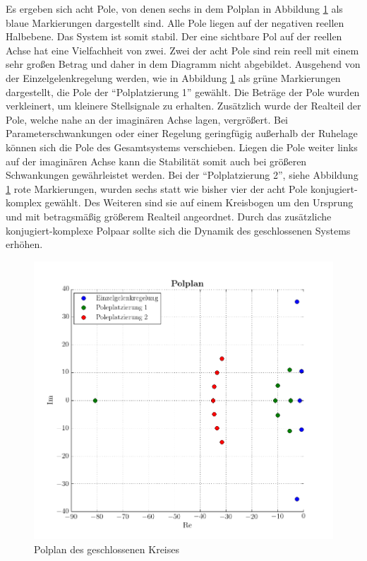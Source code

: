 Es ergeben sich acht Pole, von denen sechs in dem Polplan in Abbildung \ref{fig:Polplan} als blaue Markierungen dargestellt sind. Alle Pole liegen auf der negativen reellen Halbebene. Das System ist somit stabil.  Der eine sichtbare Pol auf der reellen Achse hat eine Vielfachheit von zwei. Zwei der acht Pole sind rein reell mit einem sehr großen Betrag und daher in dem Diagramm nicht abgebildet. \newline
Ausgehend von der Einzelgelenkregelung werden, wie in Abbildung \ref{fig:Polplan} als grüne Markierungen dargestellt, die Pole der "`Polplatzierung 1"' gewählt. Die Beträge der Pole wurden verkleinert, um kleinere Stellsignale zu erhalten. Zusätzlich  wurde der Realteil der Pole, welche nahe an der imaginären Achse lagen, vergrößert. Bei Parameterschwankungen oder einer Regelung geringfügig außerhalb der Ruhelage können sich die Pole des Gesamtsystems verschieben. Liegen die Pole weiter links auf der imaginären Achse kann die Stabilität somit auch bei größeren Schwankungen gewährleistet werden.\newline
Bei der "`Polplatzierung 2"', siehe Abbildung \ref{fig:Polplan} rote Markierungen, wurden sechs statt wie bisher vier der acht Pole konjugiert-komplex gewählt. Des Weiteren sind sie auf einem Kreisbogen um den Ursprung und mit betragsmäßig größerem Realteil angeordnet. Durch das zusätzliche konjugiert-komplexe Polpaar sollte sich die Dynamik des geschlossenen Systems erhöhen. \newline
	
	\begin{figure}[h!]
		\centering
		\includegraphics[scale=0.5]{Bilder/Pole.png}
		\caption{Polplan des geschlossenen Kreises}
		\label{fig:Polplan}
	\end{figure}
	
